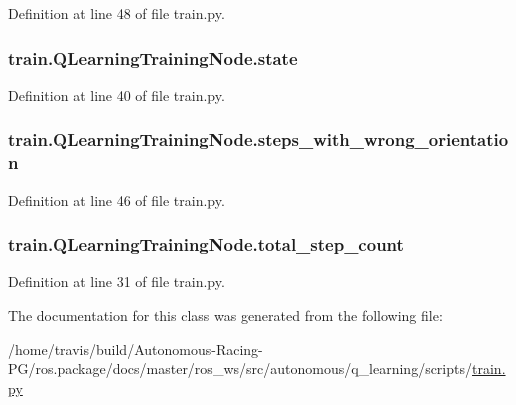 Definition at line 48 of file train.\+py.

\subsubsection[{\texorpdfstring{state}{state}}]{\setlength{\rightskip}{0pt plus 5cm}train.\+Q\+Learning\+Training\+Node.\+state}\hypertarget{classtrain_1_1_q_learning_training_node_a6e860eb510dc030f536d26c2a3fcc33c}{}\label{classtrain_1_1_q_learning_training_node_a6e860eb510dc030f536d26c2a3fcc33c}


Definition at line 40 of file train.\+py.

\subsubsection[{\texorpdfstring{steps\+\_\+with\+\_\+wrong\+\_\+orientation}{steps_with_wrong_orientation}}]{\setlength{\rightskip}{0pt plus 5cm}train.\+Q\+Learning\+Training\+Node.\+steps\+\_\+with\+\_\+wrong\+\_\+orientation}\hypertarget{classtrain_1_1_q_learning_training_node_a87a28e543665823ac18758f6a4460d7a}{}\label{classtrain_1_1_q_learning_training_node_a87a28e543665823ac18758f6a4460d7a}


Definition at line 46 of file train.\+py.

\subsubsection[{\texorpdfstring{total\+\_\+step\+\_\+count}{total_step_count}}]{\setlength{\rightskip}{0pt plus 5cm}train.\+Q\+Learning\+Training\+Node.\+total\+\_\+step\+\_\+count}\hypertarget{classtrain_1_1_q_learning_training_node_aa583fe782e5ae47cc64dd44b92fd2e71}{}\label{classtrain_1_1_q_learning_training_node_aa583fe782e5ae47cc64dd44b92fd2e71}


Definition at line 31 of file train.\+py.



The documentation for this class was generated from the following file\+:\begin{DoxyCompactItemize}
\item 
/home/travis/build/\+Autonomous-\/\+Racing-\/\+P\+G/ros.\+package/docs/master/ros\+\_\+ws/src/autonomous/q\+\_\+learning/scripts/\hyperlink{train_8py}{train.\+py}\end{DoxyCompactItemize}
